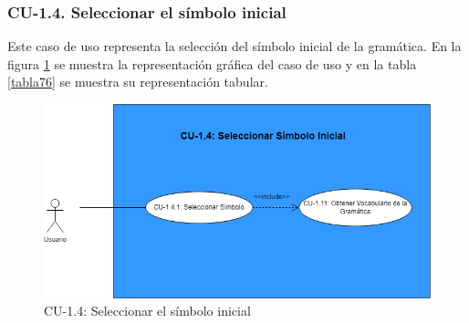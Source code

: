  \subsubsection{CU-1.4. Seleccionar el símbolo inicial}

 Este caso de uso representa la selección del símbolo inicial de la gramática. En la figura \ref{fig:CU14} se muestra la representación gráfica del caso de uso y en la  tabla \ref{tabla76} se muestra su representación tabular.

   \begin{figure}[H]
       \begin{center} 
 	\includegraphics[scale=0.55]{figuras/Cap7/CU14.png}
 	\caption{CU-1.4: Seleccionar el símbolo inicial}
 	\label{fig:CU14}
       \end{center}
   \end{figure}


